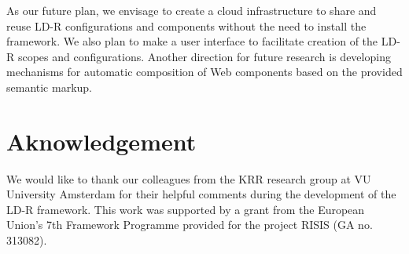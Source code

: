 \documentclass{acm_proc_article-sp}
\begin{document}
As our future plan, we envisage to create a cloud infrastructure to share and reuse LD-R configurations and components without the need to install the framework.
We also plan to make a user interface to facilitate creation of the LD-R scopes and configurations.
Another direction for future research is developing mechanisms for automatic composition of Web components based on the provided semantic markup.

\section{Aknowledgement}
We would like to thank our colleagues from the KRR research group at VU University Amsterdam for their helpful comments during the development of the LD-R framework. This work was supported by a grant from the European Union's 7th Framework Programme provided for the project RISIS (GA no. 313082).




\end{document}
